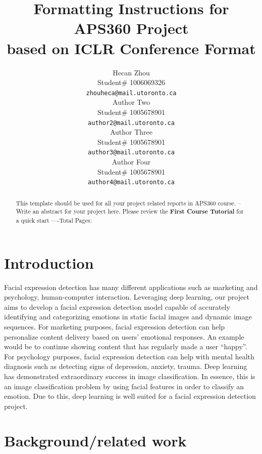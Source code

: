 \documentclass{article} %
\title{Formatting Instructions for APS360 Project  \\ 
based on ICLR Conference Format}
\author{Hecan Zhou  \\
Student\# 1006069326\\
\texttt{zhouheca@mail.utoronto.ca} \\
\And
Author Two  \\
Student\# 1005678901 \\
\texttt{author2@mail.utoronto.ca} \\
\AND
Author Three  \\
Student\# 1005678901 \\
\texttt{author3@mail.utoronto.ca} \\
\And
Author Four \\
Student\# 1005678901 \\
\texttt{author4@mail.utoronto.ca} \\
\AND
}
\begin{document}
\maketitle

\begin{abstract}
This template should be used for all your project related reports in APS360 course. -- Write an abstract for your project here. Please review the \textbf{ First Course Tutorial} for a quick start
----Total Pages: \pageref{last_page}
\end{abstract}

\section{Introduction }

Facial expression detection has many different applications such as marketing and psychology, human-computer interaction. Leveraging deep learning, our project aims to develop a facial expression detection model capable of accurately identifying and categorizing emotions in static facial images and dynamic image sequences. For marketing purposes, facial expression detection can help personalize content delivery based on users' emotional responses. An example would be to continue showing content that has regularly made a user “happy”. For psychology purposes, facial expression detection can help with mental health diagnosis such as detecting signs of depression, anxiety, trauma. Deep learning has demonstrated extraordinary success in image classification. In essence, this is an image classification problem by using facial features in order to classify an emotion. Due to this, deep learning is well suited for a facial expression detection project.

\section{Background/related work}
\end{document}
